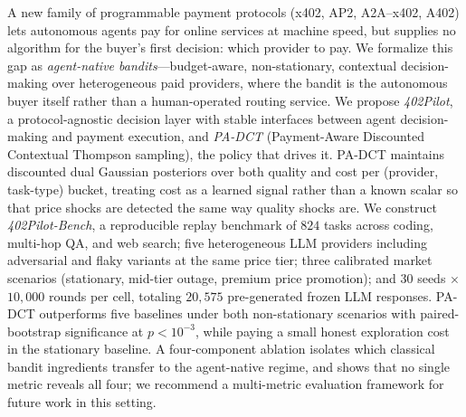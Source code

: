 A new family of programmable payment protocols (x402, AP2, A2A--x402, A402) lets autonomous agents pay for online services at machine speed, but supplies no algorithm for the buyer's first decision: which provider to pay. We formalize this gap as \emph{agent-native bandits}---budget-aware, non-stationary, contextual decision-making over heterogeneous paid providers, where the bandit is the autonomous buyer itself rather than a human-operated routing service. We propose \emph{402Pilot}, a protocol-agnostic decision layer with stable interfaces between agent decision-making and payment execution, and \emph{PA-DCT} (Payment-Aware Discounted Contextual Thompson sampling), the policy that drives it. PA-DCT maintains discounted dual Gaussian posteriors over both quality and cost per (provider, task-type) bucket, treating cost as a learned signal rather than a known scalar so that price shocks are detected the same way quality shocks are. We construct \emph{402Pilot-Bench}, a reproducible replay benchmark of $824$ tasks across coding, multi-hop QA, and web search; five heterogeneous LLM providers including adversarial and flaky variants at the same price tier; three calibrated market scenarios (stationary, mid-tier outage, premium price promotion); and $30$ seeds $\times$ $10{,}000$ rounds per cell, totaling $20{,}575$ pre-generated frozen LLM responses. PA-DCT outperforms five baselines under both non-stationary scenarios with paired-bootstrap significance at $p<10^{-3}$, while paying a small honest exploration cost in the stationary baseline. A four-component ablation isolates which classical bandit ingredients transfer to the agent-native regime, and shows that no single metric reveals all four; we recommend a multi-metric evaluation framework for future work in this setting.
